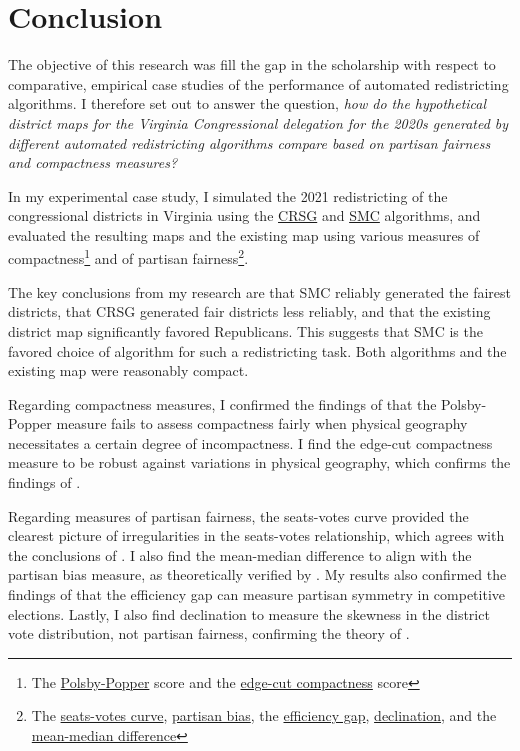 \section{Conclusion}
\label{sec:conc}

The objective of this research was fill the gap in the scholarship with respect to comparative, empirical case studies of the performance of automated redistricting algorithms. I therefore set out to answer the question, \emph{how do the hypothetical district maps for the Virginia Congressional delegation for the 2020s generated by different automated redistricting algorithms compare based on partisan fairness and compactness measures?}

In my experimental case study, I simulated the 2021 redistricting of the congressional districts in Virginia using the \hyperref[sec:crsg]{CRSG} and \hyperref[sec:smc]{SMC} algorithms, and evaluated the resulting maps and the existing map using various measures of compactness\footnote{The \hyperref[sec:polsbypopper]{Polsby-Popper} score and the \hyperref[sec:edgecut]{edge-cut compactness} score} and of partisan fairness\footnote{The \hyperref[sec:seatsvotes]{seats-votes curve}, \hyperref[sec:bias]{partisan bias}, the \hyperref[sec:effgap]{efficiency gap}, \hyperref[sec:declination]{declination}, and the \hyperref[sec:meanmed]{mean-median difference}}. 

The key conclusions from my research are that SMC reliably generated the fairest districts, that CRSG generated fair districts less reliably, and that the existing district map significantly favored Republicans. This suggests that SMC is the favored choice of algorithm for such a redistricting task. Both algorithms and the existing map were reasonably compact.

Regarding compactness measures, I confirmed the findings of \textcite{mccartan2020} that the Polsby-Popper measure fails to assess compactness fairly when physical geography necessitates a certain degree of incompactness. I find the edge-cut compactness measure to be robust against variations in physical geography, which confirms the findings of \textcite{dube2016}.

Regarding measures of partisan fairness, the seats-votes curve provided the clearest picture of irregularities in the seats-votes relationship, which agrees with the conclusions of \textcite{katz2020}. I also find the mean-median difference to align with the partisan bias measure, as theoretically verified by \textcite{katz2020}. My results also confirmed the findings of \textcite{veomett2018} that the efficiency gap can measure partisan symmetry in competitive elections. Lastly, I also find declination to measure the skewness in the district vote distribution, not partisan fairness, confirming the theory of \textcite{katz2020}. 

